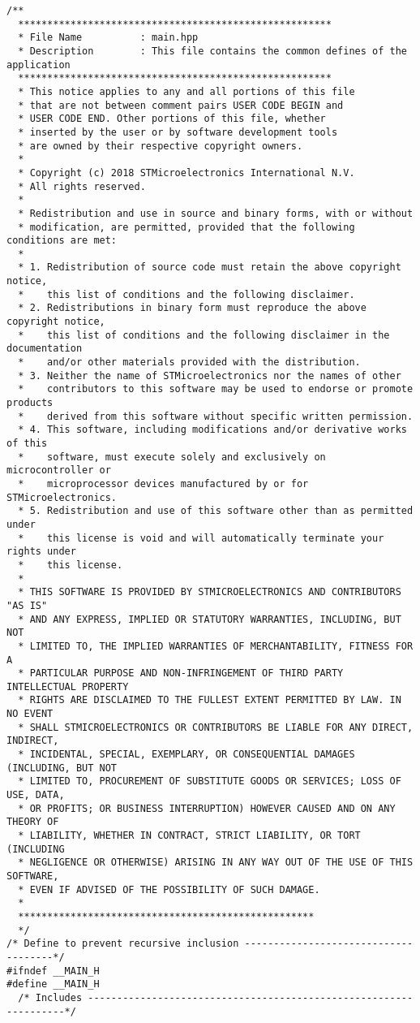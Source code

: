 \begin{lstlisting}[label=algoritmo:STM32F4:main.h,style = STM-code,frame=single,caption=STM32F4:main.h]
/**
  ******************************************************
  * File Name          : main.hpp
  * Description        : This file contains the common defines of the application
  ******************************************************
  * This notice applies to any and all portions of this file
  * that are not between comment pairs USER CODE BEGIN and
  * USER CODE END. Other portions of this file, whether 
  * inserted by the user or by software development tools
  * are owned by their respective copyright owners.
  *
  * Copyright (c) 2018 STMicroelectronics International N.V. 
  * All rights reserved.
  *
  * Redistribution and use in source and binary forms, with or without 
  * modification, are permitted, provided that the following conditions are met:
  *
  * 1. Redistribution of source code must retain the above copyright notice, 
  *    this list of conditions and the following disclaimer.
  * 2. Redistributions in binary form must reproduce the above copyright notice,
  *    this list of conditions and the following disclaimer in the documentation
  *    and/or other materials provided with the distribution.
  * 3. Neither the name of STMicroelectronics nor the names of other 
  *    contributors to this software may be used to endorse or promote products 
  *    derived from this software without specific written permission.
  * 4. This software, including modifications and/or derivative works of this 
  *    software, must execute solely and exclusively on microcontroller or
  *    microprocessor devices manufactured by or for STMicroelectronics.
  * 5. Redistribution and use of this software other than as permitted under 
  *    this license is void and will automatically terminate your rights under 
  *    this license. 
  *
  * THIS SOFTWARE IS PROVIDED BY STMICROELECTRONICS AND CONTRIBUTORS "AS IS" 
  * AND ANY EXPRESS, IMPLIED OR STATUTORY WARRANTIES, INCLUDING, BUT NOT 
  * LIMITED TO, THE IMPLIED WARRANTIES OF MERCHANTABILITY, FITNESS FOR A 
  * PARTICULAR PURPOSE AND NON-INFRINGEMENT OF THIRD PARTY INTELLECTUAL PROPERTY
  * RIGHTS ARE DISCLAIMED TO THE FULLEST EXTENT PERMITTED BY LAW. IN NO EVENT 
  * SHALL STMICROELECTRONICS OR CONTRIBUTORS BE LIABLE FOR ANY DIRECT, INDIRECT,
  * INCIDENTAL, SPECIAL, EXEMPLARY, OR CONSEQUENTIAL DAMAGES (INCLUDING, BUT NOT
  * LIMITED TO, PROCUREMENT OF SUBSTITUTE GOODS OR SERVICES; LOSS OF USE, DATA, 
  * OR PROFITS; OR BUSINESS INTERRUPTION) HOWEVER CAUSED AND ON ANY THEORY OF 
  * LIABILITY, WHETHER IN CONTRACT, STRICT LIABILITY, OR TORT (INCLUDING 
  * NEGLIGENCE OR OTHERWISE) ARISING IN ANY WAY OUT OF THE USE OF THIS SOFTWARE,
  * EVEN IF ADVISED OF THE POSSIBILITY OF SUCH DAMAGE.
  *
  ***************************************************
  */
/* Define to prevent recursive inclusion -------------------------------------*/
#ifndef __MAIN_H
#define __MAIN_H
  /* Includes ------------------------------------------------------------------*/


\end{lstlisting}
